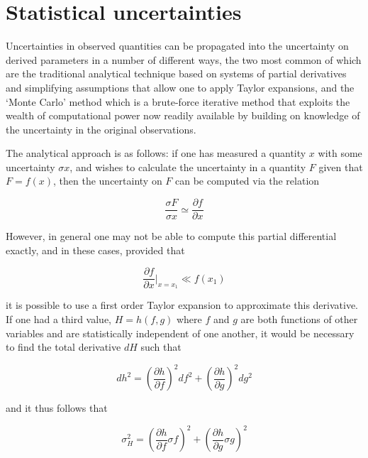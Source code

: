 \documentclass[useAMS,usenatbib]{mn2e}
\begin{document}
\section{Statistical uncertainties}

Uncertainties in observed quantities can be propagated into the uncertainty on derived parameters in a number of different ways, the two most common of which are the traditional analytical technique based on systems of partial derivatives and simplifying assumptions that allow one to apply Taylor expansions, and the `Monte Carlo' method which is a brute-force iterative method that exploits the wealth of computational power now readily available by building on knowledge of the uncertainty in the original observations.

The analytical approach is as follows: if one has measured a quantity $x$ with some uncertainty $\sigma x$, and wishes to calculate the uncertainty in a quantity $F$ given that $F = f(x)$, then the uncertainty on $F$ can be computed via the relation 

\begin{equation}
  \frac{\sigma F}{\sigma x} \simeq \frac{\partial f}{\partial x}
\end{equation}

However, in general one may not be able to compute this partial differential exactly, and in these cases, provided that

\begin{equation}
  \frac{\partial f}{\partial x}|_{x=x_1} \ll f(x_1)
\end{equation}

it is possible to use a first order Taylor expansion to approximate this derivative.  If one had a third value, $H = h(f, g)$ where $f$ and $g$ are both functions of other variables and are statistically independent of one another, it would be necessary to find the total derivative $dH$ such that

\begin{equation}
dh^2 = \left(\frac{\partial h}{\partial f}\right)^2df^2 + \left(\frac{\partial h}{\partial g}\right)^2dg^2
\end{equation}

and it thus follows that

\begin{equation}
\sigma^2_H = \left(\frac{\partial h}{\partial f}\sigma f\right)^2 + \left(\frac{\partial h}{\partial g}\sigma g\right)^2
\end{equation}
\end{document}
